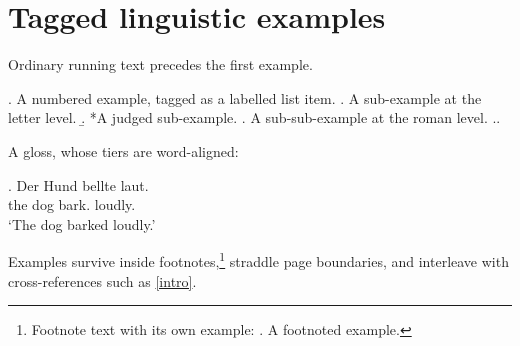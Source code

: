 \documentclass{article}
\begin{document}
\section{Tagged linguistic examples}

Ordinary running text precedes the first example.

\ex.\label{intro} A numbered example, tagged as a labelled list item.
\a. A sub-example at the letter level.
\b. *A judged sub-example.
\a. A sub-sub-example at the roman level.
\z.\z.

A gloss, whose tiers are word-aligned:

\exg. Der Hund bellte laut.\\
      the dog bark. loudly.\\
\glt `The dog barked loudly.'

Examples survive inside footnotes,\footnote{Footnote text with its own
example: \ex. A footnoted example. }
straddle page boundaries, and interleave with cross-references such as
\ref{intro}.
\end{document}
